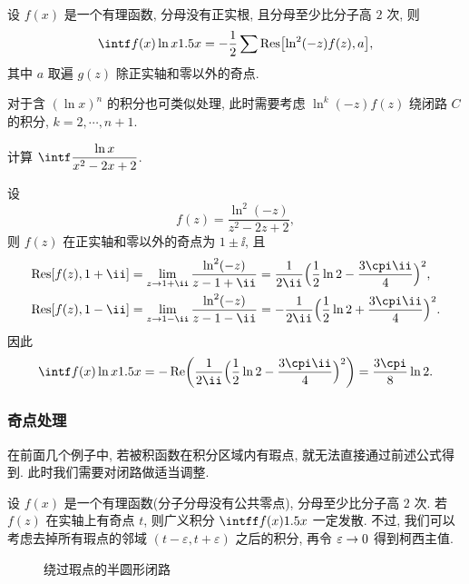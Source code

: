 \begin{theorem}
  设 $f(x)$ 是一个有理函数, 分母没有正实根, 且分母至少比分子高 $2$ 次, 则
  \[
    \intf f(x)\ln x\d x
    =-\frac12 \sum \Res\bigl[\ln^2(-z)f(z),a\bigr],
  \]
  其中 $a$ 取遍 $g(z)$ 除正实轴和零以外的奇点.
\end{theorem}
对于含 $(\ln x)^n$ 的积分也可类似处理, 此时需要考虑 $\ln^k(-z)f(z)$ 绕闭路 $C$ 的积分, $k=2,\cdots,n+1$.

\begin{exercise}
  计算 $\intf\dfrac{\ln x}{x^2-2x+2}$.
\end{exercise}


\begin{solution}
  设
  \[
    f(z)=\dfrac{\ln^2(-z)}{z^2-2z+2},
  \]
  则 $f(z)$ 在正实轴和零以外的奇点为 $1\pm\ii$,
  且
  \begin{align*}
     \Res[f(z),1+\ii]&
    =\lim_{z\ra 1+\ii}\frac{\ln^2(-z)}{z-1+\ii}
    =\frac1{2\ii}\Bigl(\frac12\ln2-\frac{3\cpi\ii}4\Bigr)^2,
    \\
     \Res[f(z),1-\ii]&
    =\lim_{z\ra 1-\ii}\frac{\ln^2(-z)}{z-1-\ii}
    =-\frac1{2\ii}\Bigl(\frac12\ln2+\frac{3\cpi\ii}4\Bigr)^2.
  \end{align*}
  因此
  \[
     \intf f(x)\ln x\d x
    =-\Re\biggl(\frac1{2\ii}\Bigl(\frac12\ln2-\frac{3\cpi\ii}4\Bigr)^2\biggr)
    =\frac{3\cpi}8\ln2.
  \]
\end{solution}


\subsubsection{奇点处理}
在前面几个例子中, 若被积函数在积分区域内有瑕点, 就无法直接通过前述公式得到.
此时我们需要对闭路做适当调整.

设 $f(x)$ 是一个有理函数(分子分母没有公共零点), 分母至少比分子高 $2$ 次.
若 $f(z)$ 在实轴上有奇点 $t$, 则广义积分 $\intff f(x)\d x$ 一定发散.
不过, 我们可以考虑去掉所有瑕点的邻域 $(t-\varepsilon,t+\varepsilon)$ 之后的积分, 再令 $\varepsilon\rightarrow 0$ 得到柯西主值.

\begin{figure}[!htb]
  \centering
  \caption{绕过瑕点的半圆形闭路}
  \label{fig:half-circle-remove-singular-contour}
\end{figure}

